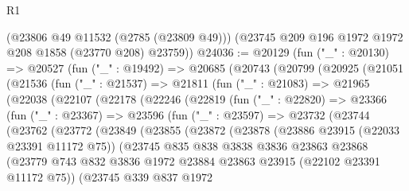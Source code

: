 \begin{lexlean}{R1}
\begin{coremodule}
      (@23806 @49 @11532 (@2785 (@23809 @49)))
      (@23745 @209 @196 @1972 @1972 @208 @1858 (@23770 @208) @23759))
@24036 := @20129
    (fun ("_" : @20130) =>
    @20527
      (fun ("_" : @19492) =>
      @20685
        (@20743
          (@20799
            (@20925
              (@21051
                (@21536
                  (fun ("_" : @21537) =>
                  @21811
                    (fun ("_" : @21083) =>
                    @21965
                      (@22038
                        (@22107
                          (@22178
                            (@22246
                              (@22819
                                (fun ("_" : @22820) =>
                                @23366
                                  (fun ("_" : @23367) =>
                                  @23596
                                    (fun ("_" : @23597) =>
                                    @23732
                                      (@23744
                                        (@23762
                                          (@23772
                                            (@23849
                                              (@23855
                                                (@23872
                                                  (@23878
                                                    (@23886 @23915 (@22033 @23391 @11172 @75))
                                                    (@23745
                                                      @835
                                                      @838
                                                      @3838
                                                      @3836
                                                      @23863
                                                      @23868
                                                      (@23779
                                                        @743
                                                        @832
                                                        @3836
                                                        @1972
                                                        @23884
                                                        @23863
                                                        @23915
                                                        (@22102 @23391 @11172 @75))
                                                      (@23745
                                                        @339
                                                        @837
                                                        @1972

\end{coremodule}
\end{lexlean}
